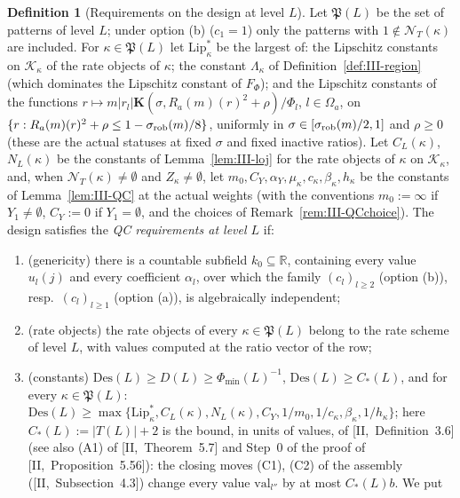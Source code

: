 \documentclass[10pt]{amsart}
\theoremstyle{definition}
\newtheorem{definition}[theorem]{Definition}
\theoremstyle{remark}
\newcommand{\R}{\mathbb R}
\begin{document}
\begin{definition}[Requirements on the design at level $L$]\label{def:III-QCreq}
Let $\mathfrak P(L)$ be the set of patterns of level $L$; under option (b)
($c_1=1$) only the patterns with $1\notin\mathcal N_T(\kappa)$ are included.
For $\kappa\in\mathfrak P(L)$ let $\mathrm{Lip}^*_\kappa$ be the largest of: the
Lipschitz constants on $\mathcal K_\kappa$ of the rate objects of $\kappa$; the
constant $\Lambda_\kappa$ of Definition~\ref{def:III-region} (which dominates
the Lipschitz constant of $F_\Phi$); and the Lipschitz constants of the
functions $r\mapsto m|r_l|\mathbf K(\sigma,R_a(m)(r)^2+\rho)/\Phi_l$, $l\in\Omega_a$,
on $\{r:R_a(m)(r)^2+\rho\le1-\sigma_{\rm rob}(m)/8\}$, uniformly in $\sigma\in
[\sigma_{\rm rob}(m)/2,1]$ and $\rho\ge0$ (these are the actual statuses at fixed
$\sigma$ and fixed inactive ratios).  Let $C_L(\kappa)$, $N_L(\kappa)$ be the
constants of Lemma~\ref{lem:III-loj} for the rate objects of $\kappa$ on
$\mathcal K_\kappa$, and, when $\mathcal N_T(\kappa)\ne\emptyset$ and
$Z_\kappa\ne\emptyset$, let $m_0,C_Y,\alpha_Y,\mu_\kappa,c_\kappa,\beta_\kappa,h_\kappa$
be the constants of Lemma~\ref{lem:III-QC} at the actual weights (with the
conventions $m_0:=\infty$ if $Y_1\ne\emptyset$, $C_Y:=0$ if $Y_1=\emptyset$, and
the choices of Remark~\ref{rem:III-QCchoice}).  The design satisfies the
\emph{QC requirements at level $L$} if:
\begin{enumerate}
\item[(QC1)] \textup{(genericity)} there is a countable subfield $k_0\subseteq\R$,
containing every value $u_l(j)$ and every coefficient $\alpha_l$, over which
the family $(c_l)_{l\ge2}$ (option (b)), resp.\ $(c_l)_{l\ge1}$ (option (a)),
is algebraically independent;
\item[(QC2)] \textup{(rate objects)} the rate objects of every $\kappa\in
\mathfrak P(L)$ belong to the rate scheme of level $L$, with values computed
at the ratio vector of the row;
\item[(QC3)] \textup{(constants)} $\mathrm{Des}(L)\ge D(L)\ge\Phi_{\min}(L)^{-1}$,
$\mathrm{Des}(L)\ge C_*(L)$, and for every $\kappa\in\mathfrak P(L)$:
$\mathrm{Des}(L)\ge\max\{\mathrm{Lip}^*_\kappa,C_L(\kappa),N_L(\kappa),C_Y,1/m_0,
1/c_\kappa,\beta_\kappa,1/h_\kappa\}$; here $C_*(L):=|T(L)|+2$ is the bound,
in units of values, of [II,~Definition~3.6] (see also (A1) of
[II,~Theorem~5.7] and Step~0 of the proof of [II,~Proposition~5.56]): the
closing moves (C1), (C2) of the assembly ([II,~Subsection~4.3]) change
every value $\mathrm{val}_{l''}$ by at most $C_*(L)b$.  We put

\end{enumerate}
\end{definition}
\end{document}

